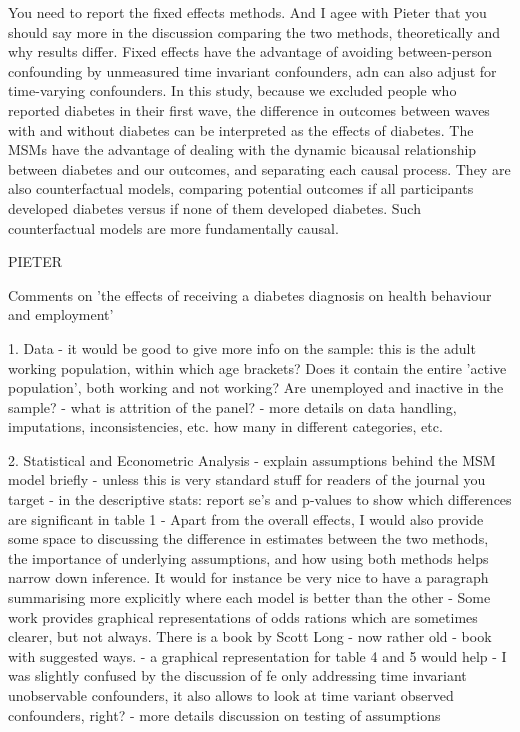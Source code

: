 You need to report the fixed effects methods. And I agee with Pieter that you should say more in the discussion comparing the two methods, theoretically and why results differ. Fixed effects have the advantage of avoiding between-person confounding by unmeasured time invariant confounders, adn can also adjust for time-varying confounders.  In this study, because we excluded people who reported diabetes in their first wave, the difference in outcomes between waves with and without diabetes can be interpreted as the effects of diabetes. The MSMs have the advantage of dealing with the dynamic bicausal relationship between diabetes and our outcomes, and separating each causal process. They are also counterfactual models, comparing potential outcomes if all participants developed diabetes versus if none of them developed diabetes. Such counterfactual models are more fundamentally causal.

PIETER

Comments on 'the effects of receiving a diabetes diagnosis on health behaviour and employment'

1. Data
- it would be good to give more info on the sample: this is the adult working population, within which age brackets? Does it contain the entire 'active population', both working and not working?  Are unemployed and inactive in the sample?
- what is attrition of the panel?
- more details on data handling, imputations, inconsistencies, etc. how many in different categories, etc.

2. Statistical and Econometric Analysis
- explain assumptions behind the MSM model briefly - unless this is very standard stuff for readers of the journal you target
- in the descriptive stats: report se's and p-values to show  which differences are significant in table 1
- Apart from the overall effects, I would also provide some space to discussing the difference in estimates between the two methods, the importance of underlying assumptions, and how using both methods helps narrow down inference. It would for instance be very nice to have a paragraph summarising more explicitly where each model is better than the other
- Some work provides graphical representations of odds rations which are sometimes clearer, but not always.  There is a book by Scott Long - now rather old - book with suggested ways. 
- a  graphical representation for table 4 and 5 would help
- I was slightly confused by the discussion of fe only addressing time invariant unobservable confounders, it also allows to look at time variant observed confounders, right?
- more details discussion on testing of assumptions

